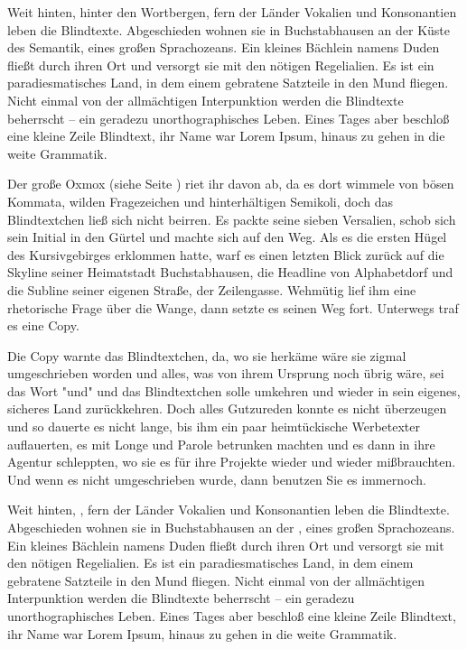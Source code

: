 Weit hinten, hinter den Wortbergen, fern der Länder Vokalien und Konsonantien leben die Blindtexte. Abgeschieden wohnen sie in Buchstabhausen an der Küste des Semantik, eines großen Sprachozeans. Ein kleines Bächlein namens Duden fließt durch ihren Ort und versorgt sie mit den nötigen Regelialien. Es ist ein paradiesmatisches Land, in dem einem gebratene Satzteile in den Mund fliegen. Nicht einmal von der allmächtigen Interpunktion werden die Blindtexte beherrscht – ein geradezu unorthographisches Leben. Eines Tages aber beschloß eine kleine Zeile Blindtext, ihr Name war Lorem Ipsum, hinaus zu gehen in die weite Grammatik.

Der große Oxmox (siehe Seite \pageref{oxmox}) riet ihr davon ab, da es dort wimmele von bösen Kommata, wilden Fragezeichen und hinterhältigen Semikoli, doch das Blindtextchen ließ sich nicht beirren. Es packte seine sieben Versalien, schob sich sein Initial in den Gürtel und machte sich auf den Weg. Als es die ersten Hügel des Kursivgebirges erklommen hatte, warf es einen letzten Blick zurück auf die Skyline seiner Heimatstadt Buchstabhausen, die Headline von Alphabetdorf und die Subline seiner eigenen Straße, der Zeilengasse. Wehmütig lief ihm eine rhetorische Frage über die Wange, dann setzte es seinen Weg fort. Unterwegs traf es eine Copy.

Die Copy warnte das Blindtextchen, da, wo sie herkäme wäre sie zigmal umgeschrieben worden und alles, was von ihrem Ursprung noch übrig wäre, sei das Wort "und" und das Blindtextchen solle umkehren und wieder in sein eigenes, sicheres Land zurückkehren. Doch alles Gutzureden konnte es nicht überzeugen und so dauerte es nicht lange, bis ihm ein paar heimtückische Werbetexter auflauerten, es mit Longe und Parole betrunken machten und es dann in ihre Agentur schleppten, wo sie es für ihre Projekte wieder und wieder mißbrauchten. Und wenn es nicht umgeschrieben wurde, dann benutzen Sie es immernoch.

Weit hinten, , fern der Länder Vokalien und Konsonantien leben die Blindtexte. Abgeschieden wohnen sie in Buchstabhausen an der , eines großen Sprachozeans. Ein kleines Bächlein namens Duden fließt durch ihren Ort und versorgt sie mit den nötigen Regelialien. Es ist ein paradiesmatisches Land, in dem einem gebratene Satzteile in den Mund fliegen. Nicht einmal von der allmächtigen Interpunktion werden die Blindtexte beherrscht – ein geradezu unorthographisches Leben. Eines Tages aber beschloß eine kleine Zeile Blindtext, ihr Name war Lorem Ipsum, hinaus zu gehen in die weite Grammatik.

